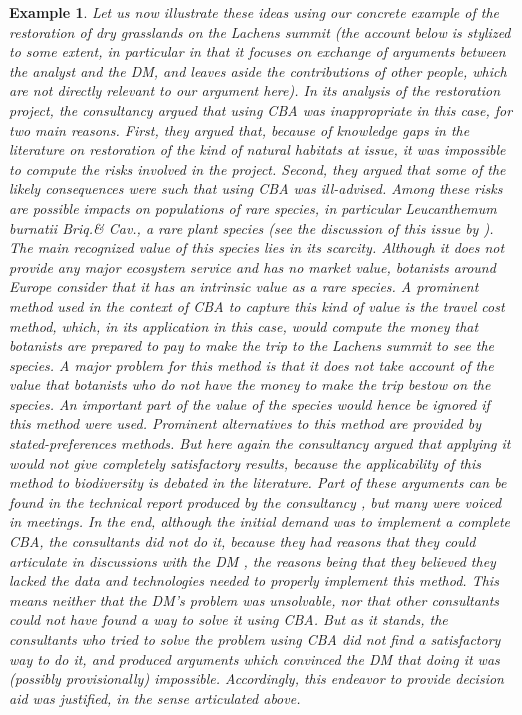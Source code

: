 \documentclass[preprint, french, english, 11pt, authoryear]{elsarticle}%
\newtheorem{example}{Example}
\begin{document}
\begin{example}
Let us now illustrate these ideas using our concrete example of the restoration of dry grasslands on the Lachens summit 
(the account below is stylized to some extent, in particular in that it focuses on exchange of arguments between the analyst and the \ac{DM}, and leaves aside the contributions of other people, which are not directly relevant to our argument here). 
In its analysis of the restoration project, the consultancy argued that using \ac{CBA}
 was inappropriate in this case, for two main reasons. 
First, they argued that, because of knowledge gaps in the literature on restoration of the kind of natural habitats at issue, it was impossible to compute the risks involved in the project. 
Second, they argued that some of the likely consequences were such that using \ac{CBA}
 was ill-advised.
 Among these risks are possible impacts on populations of rare species, in particular \emph{Leucanthemum burnatii} Briq.\@ \& Cav.\@, a rare plant species (see the discussion of this issue by \citet{meinard_ethical_2016}).
The main recognized value of this species lies in its scarcity. Although it does not provide any major ecosystem service and has no market value, botanists around Europe consider that it has an intrinsic value as a rare species.
A prominent method used in the context of \ac{CBA}
 to capture this kind of value is the travel cost method, which, in its application in this case, would compute the money that botanists are prepared to pay to make the trip to the Lachens summit to see the species.
A major problem for this method is that it does not take account of the value that botanists who do not have the money to make the trip bestow on the species. An important part of the value of the species would hence be ignored if this method were used.
Prominent alternatives to this method are provided by stated-preferences methods. But here again the consultancy argued that applying it would not give completely satisfactory results, because the applicability of this method to biodiversity is debated in the literature.
Part of these arguments can be found in the technical report produced by the consultancy \citep{meinard_etude_2015}, but many were voiced in meetings.
In the end, although the initial demand was to implement a complete \ac{CBA}, the consultants did not do it, because they had reasons that they could articulate in discussions with the \ac{DM}
, the reasons being that they believed they lacked the data and technologies needed to properly implement this method. 
This means neither that the \ac{DM}’s problem was unsolvable, nor that other consultants could not have found a way to solve it using \ac{CBA}.
But as it stands, the consultants who tried to solve the problem using \ac{CBA}
 did not find a satisfactory way to do it, and produced arguments which convinced the \ac{DM}
  that doing it was (possibly provisionally) impossible.
Accordingly, this endeavor to provide decision aid was justified, in the sense articulated above.
\end{example}
\end{document}
